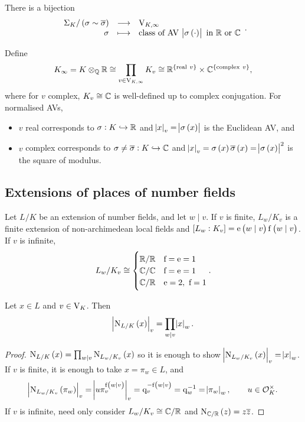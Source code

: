 \begin{theorem}
There is a bijection
$$ \function{\Sigma_K / \br{\sigma \sim \overline{\sigma}}}{\V_{K, \infty}}{\sigma}{\text{class of AV} \ \abs{\sigma\br{\cdot}} \ \text{in} \ \RR \ \text{or} \ \CC}. $$
\end{theorem}

\pagebreak

\begin{notation*}
Define
$$ K_\infty = K \otimes_\QQ \RR \cong \prod_{v \in \V_{K, \infty}} K_v \cong \RR^{\cbr{\text{real} \ v}} \times \CC^{\cbr{\text{complex} \ v}}, $$
where for $ v $ complex, $ K_v \cong \mathbb{C} $ is well-defined up to complex conjugation. For normalised AVs,
\begin{itemize}
\item $ v $ real corresponds to $ \sigma : K \hookrightarrow \mathbb{R} $ and $ \abs{x}_v = \abs{\sigma\br{x}} $ is the Euclidean AV, and
\item $ v $ complex corresponds to $ \sigma \ne \overline{\sigma} : K \hookrightarrow \mathbb{C} $ and $ \abs{x}_v = \sigma\br{x}\overline{\sigma}\br{x} = \abs{\sigma\br{x}}^2 $ is the square of modulus.
\end{itemize}
\end{notation*}

\subsection{Extensions of places of number fields}

Let $ L / K $ be an extension of number fields, and let $ w \mid v $. If $ v $ is finite, $ L_w / K_v $ is a finite extension of non-archimedean local fields and $ \sbr{L_w : K_v} = \e\br{w \mid v}\f\br{w \mid v} $. If $ v $ is infinite,
$$ L_w / K_v \cong
\begin{cases}
\mathbb{R} / \mathbb{R} & \mathrm{f} = \mathrm{e} = 1 \\
\mathbb{C} / \mathbb{C} & \mathrm{f} = \mathrm{e} = 1 \\
\mathbb{C} / \mathbb{R} & \mathrm{e} = 2, \ \mathrm{f} = 1
\end{cases}.
$$


\begin{proposition}
Let $ x \in L $ and $ v \in \mathrm{V}_K $. Then
$$ \abs{\N_{L / K}\br{x}}_v = \prod_{w \mid v} \abs{x}_w. $$
\end{proposition}

\begin{proof}
$ \N_{L / K}\br{x} = \prod_{w \mid v} \N_{L_w / K_v}\br{x} $ so it is enough to show $ \abs{\N_{L_w / K_v}\br{x}}_v = \abs{x}_w $. If $ v $ is finite, it is enough to take $ x = \pi_w \in L $, and
$$ \abs{\N_{L_w / K_v}\br{\pi_w}}_v = \abs{u\pi_v^{\f\br{w \mid v}}}_v = \q_v^{-\f\br{w \mid v}} = \q_w^{-1} = \abs{\pi_w}_w, \qquad u \in \OOO_K^\times. $$
If $ v $ is infinite, need only consider $ L_w / K_v \cong \mathbb{C} / \mathbb{R} $ and $ \N_{\CC / \RR}\br{z} = z\overline{z} $.
\end{proof}

